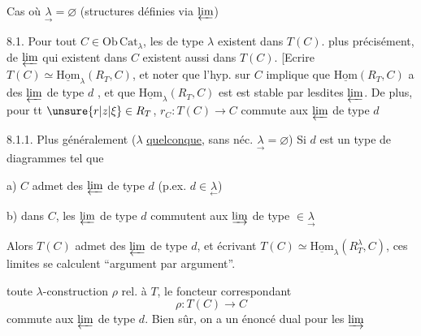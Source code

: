  Cas où $\underset{\rightarrow}{\lambda}=\varnothing$ (structures définies via $\varprojlim$)

8.1. Pour tout $C\in\mathrm{Ob}\,\mathrm{Cat}_{\lambda}$, les \inserted{$\varprojlim$} de type $\lambda$ existent dans $T(C)$.
plus précisément,   de $\varprojlim$ qui existent dans $C$
existent aussi dans $T(C)$. [Ecrire $T(C)\simeq\underline{\mathrm{Hom}}_\lambda(R_T,C)$,
et noter que  l'hyp. sur $C$ implique que $\underline{\mathrm{Hom}}(R_T,C)$
 a des $\varprojlim$ de type $d$ , et que  $\underline{\mathrm{Hom}}_\lambda(R_T,C)$
est  est stable par lesdites $\varprojlim$. De plus, pour tt
$\unsure{r|z|\xi}\in R_T$,  $r_C:T(C)\longrightarrow C$ commute aux $\varprojlim$ de type $d$

8.1.1. Plus généralement ($\lambda$ \uline{quelconque}, sans néc. $\underset{\rightarrow}{\lambda}=\varnothing$)
Si  $d$  est un type de diagrammes tel que

a) $C$ admet des $\varprojlim$ de type $d$ (p.ex. $d\in\underset{\leftarrow}{\lambda}$)

b) dans $C$, les $\varprojlim$ de type $d$ commutent aux
$\varinjlim$ de type $\in\underset{\rightarrow}{\lambda}$

Alors  $T(C)$ admet des $\varprojlim$ de type $d$, et
 écrivant $T(C)\simeq\underline{\mathrm{Hom}}_\lambda(R_T^\lambda,C)$,
ces limites se calculent ``argument par argument''.


toute  $\lambda$-construction $\rho$ rel. à $T$, le foncteur
correspondant
\[
\rho:T(C)\longrightarrow C
\]
commute aux $\varprojlim$ de type $d$. Bien sûr, on a un
énoncé dual pour les $\varinjlim$


